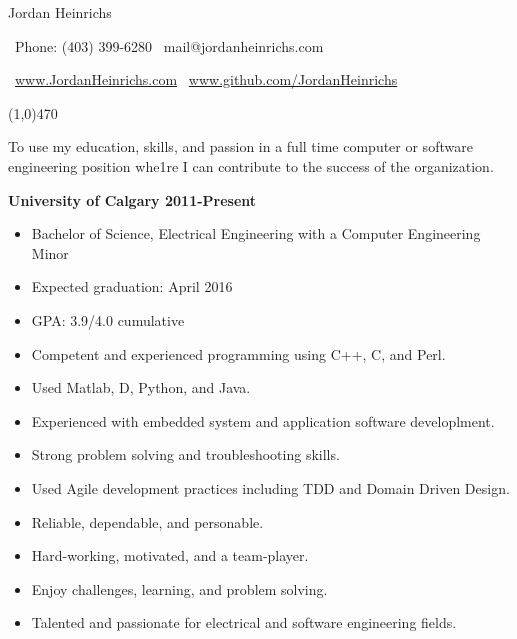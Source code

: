 \documentclass[12pt]{article}
\begin{document}

\centerline{{\Huge \sc Jordan Heinrichs}}
\medskip
\centerline{\textbullet\ Phone: (403) 399-6280 \hspace{5pt} \textbullet\ mail@jordanheinrichs.com}
\centerline{\textbullet\ \url{www.JordanHeinrichs.com}  \hspace{5pt} \textbullet\ \url{www.github.com/JordanHeinrichs}}
\noindent
\line(1,0){470}\\

\medskip
{}
\medskip

\noindent To use my education, skills, and passion in a full time computer or software engineering position whe1re I can contribute to the success of the organization.

\bigskip
{}
\medskip

\noindent \centerline{ \bf University of Calgary \hfill 2011-Present}
\begin{itemize}[parsep=0pt,partopsep=0pt]
  \item Bachelor of Science, Electrical Engineering with a Computer Engineering Minor
  \item Expected graduation: April 2016
  \item GPA: 3.9/4.0 cumulative
\end{itemize}

\bigskip
{}
\medskip
\begin{itemize}
\item Competent and experienced programming using C++, C, and Perl.
\item Used Matlab, D, Python, and Java.
\item Experienced with embedded system and application software developlment.
\item Strong problem solving and troubleshooting skills.
\item Used Agile development practices including TDD and Domain Driven Design.
\bigskip
\item Reliable, dependable, and personable.
\item Hard-working, motivated, and a team-player.
\item Enjoy challenges, learning, and problem solving.
\item Talented and passionate for electrical and software engineering fields.
\end{itemize}
\noindent

\bigskip
{}
\medskip
\end{document}
